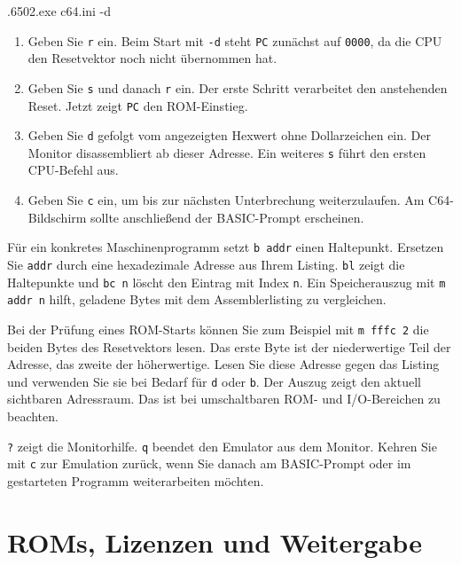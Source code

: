 \documentclass[fontsize=10.2bp,DIV=calc,oneside,open=any,headings=normal,numbers=noenddot]{scrbook}
\begin{document}
\begin{commandblock}
.\bin\sbc6502.exe c64.ini -d
\end{commandblock}

\begin{enumerate}
  \item Geben Sie \texttt{r} ein. Beim Start mit \texttt{-d} steht
    \texttt{PC} zunächst auf \texttt{0000}, da die CPU den Resetvektor
    noch nicht übernommen hat.
  \item Geben Sie \texttt{s} und danach \texttt{r} ein. Der erste Schritt
    verarbeitet den anstehenden Reset. Jetzt zeigt \texttt{PC} den
    ROM-Einstieg.
  \item Geben Sie \texttt{d} gefolgt vom angezeigten Hexwert ohne
    Dollarzeichen ein. Der Monitor disassembliert ab dieser Adresse.
    Ein weiteres \texttt{s} führt den ersten CPU-Befehl aus.
  \item Geben Sie \texttt{c} ein, um bis zur nächsten Unterbrechung
    weiterzulaufen. Am C64-Bildschirm sollte anschließend der BASIC-Prompt
    erscheinen.
\end{enumerate}

Für ein konkretes Maschinenprogramm setzt \texttt{b addr} einen Haltepunkt.
Ersetzen Sie \texttt{addr} durch eine hexadezimale Adresse aus Ihrem Listing.
\texttt{bl} zeigt die Haltepunkte und \texttt{bc n} löscht den Eintrag mit
Index \texttt{n}. Ein Speicherauszug mit \texttt{m addr n} hilft, geladene
Bytes mit dem Assemblerlisting zu vergleichen.

Bei der Prüfung eines ROM-Starts können Sie zum Beispiel mit
\texttt{m fffc 2} die beiden Bytes des Resetvektors lesen. Das erste Byte
ist der niederwertige Teil der Adresse, das zweite der höherwertige. Lesen
Sie diese Adresse gegen das Listing und verwenden Sie sie bei Bedarf für
\texttt{d} oder \texttt{b}. Der Auszug zeigt den aktuell sichtbaren
Adressraum. Das ist bei umschaltbaren ROM- und I/O-Bereichen zu beachten.

\texttt{?} zeigt die Monitorhilfe. \texttt{q} beendet den Emulator aus dem
Monitor. Kehren Sie mit \texttt{c} zur Emulation zurück, wenn Sie danach
am BASIC-Prompt oder im gestarteten Programm weiterarbeiten möchten.

\section{ROMs, Lizenzen und Weitergabe}\label{sec:rom-licenses}
\end{document}
